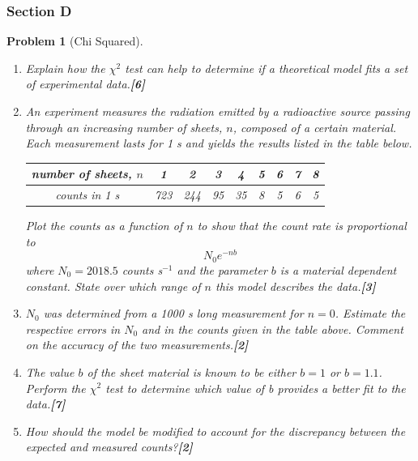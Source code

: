 \documentclass[a4paper]{article}
\theoremstyle{new}
\newtheorem{qns}{Problem}[subsection]
\begin{document}
\subsubsection{Section D}
\begin{qns}[Chi Squared]\leavevmode
\begin{enumerate}[label=(\alph*)]
\item Explain how the $\chi^2$ test can help to determine if a theoretical model fits a set of experimental data.\hfill\textbf{[6]}
\item An experiment measures the radiation emitted by a radioactive source passing through an increasing number of sheets, $n$, composed of a certain material. Each measurement lasts for 1 s and yields the results listed in the table below.
\begin{center}
\begin{tabular}{ |c|c|c|c|c|c|c|c|c|}
\hline
number of sheets, $n$ & 1 & 2 & 3 & 4 & 5 & 6 & 7 &8 \\
\hline
counts in 1 s & 723 & 244 & 95 & 35 & 8 & 5 &6 &5\\
\hline
\end{tabular}
\end{center}
Plot the counts as a function of $n$ to show that the count rate is proportional to
$$N_0e^{-nb}$$
where $N_0 = 2018.5$ counts s$^{-1}$ and the parameter $b$ is a material dependent constant. State over which range of $n$ this model describes the data.\hfill\textbf{[3]}
\item $N_0$ was determined from a 1000 s long measurement for $n = 0$. Estimate the respective errors in $N_0$ and in the counts given in the table above. Comment on the accuracy of the two measurements.\hfill\textbf{[2]}
\item The value $b$ of the sheet material is known to be either $b = 1$ or $b = 1.1$. Perform the $\chi^2$ test to determine which value of b provides a better fit to the data.\hfill\textbf{[7]}
\item How should the model be modified to account for the discrepancy between the expected and measured counts?\hfill\textbf{[2]}
\end{enumerate}
\end{qns}
\end{document}
